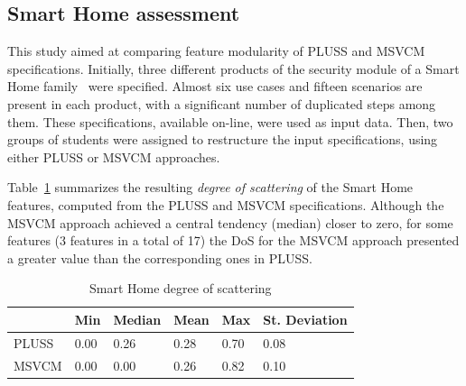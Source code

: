 \subsection{Smart Home assessment}

This study aimed at comparing feature modularity of PLUSS and MSVCM
specifications. Initially, three different products of the security module of a
Smart Home family~\cite{Pohl:2005aa} were specified. Almost six use cases and
fifteen scenarios are present in each product, with a significant number of
duplicated steps among them. These specifications, available on-line, were used
as input data. Then, two groups of students were assigned to restructure the
input specifications, using either PLUSS or MSVCM approaches. 




Table~\ref{tab:sh-dos} summarizes the resulting \emph{degree of scattering} of
the Smart Home features, computed from the PLUSS and MSVCM specifications.
Although the MSVCM approach achieved a central tendency (median) closer to
zero, for some features (3 features in a total of 17) the DoS for the MSVCM approach
presented a greater value than the corresponding ones in PLUSS.


\begin{table}[htb]
\centering
\caption{Smart Home degree of scattering}
\label{tab:sh-dos}
\begin{small}
\begin{tabular}{llllll} \hline
					& Min 	& Median 	& Mean 	& Max 	& St. Deviation \\ \hline 
	PLUSS			& 0.00  & 0.26   	& 0.28  & 0.70 	& 0.08 			\\
	MSVCM	& 0.00  & 0.00  	& 0.26 	& 0.82 & 0.10  		\\ \hline	
\end{tabular}
\end{small}
\end{table}

